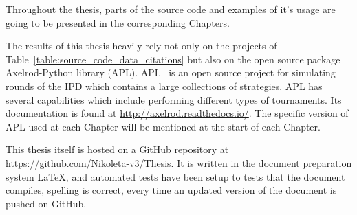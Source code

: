 \begin{table}[htbp]
    \centering
    \caption{Citations and GitHub url for source code and data used in the thesis.}
    \label{table:source_code_data_citations}
\end{table}

Throughout the thesis, parts of the source code and examples of it's usage are
going to be presented in the corresponding Chapters.

The results of this thesis heavily rely not only on the projects of
Table~\ref{table:source_code_data_citations} but also on the open source package
Axelrod-Python library (APL). APL~\cite{axelrodproject} is an open source
project for simulating rounds of the IPD which contains a large collections of
strategies. APL has several capabilities which include performing different
types of tournaments. Its documentation is found at
\url{http://axelrod.readthedocs.io/}. The specific version of APL used at each
Chapter will be mentioned at the start of each Chapter.

This thesis itself is hosted on a GitHub repository at
\url{https://github.com/Nikoleta-v3/Thesis}. It is written in the document
preparation system \LaTeX, and automated tests have been setup to tests
that the document compiles, spelling is correct, every time
an updated version of the document is pushed on GitHub.
